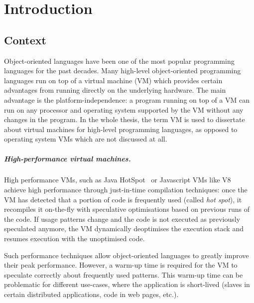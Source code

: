 \documentclass[a4paper,12pt,twoside]{../includes/ThesisStyle}
\begin{document}
\fi

\chapter{Introduction}
\label{chap:intro}
\minitoc

\section{Context}

Object-oriented languages have been one of the most popular programming languages for the past decades. Many high-level object-oriented programming languages run on top of a virtual machine (VM) which provides certain advantages from running directly on the underlying hardware. The main advantage is the platform-independence: a program running on top of a VM can run on any processor and operating system supported by the VM without any changes in the program. In the whole thesis, the term VM is used to dissertate about virtual machines for high-level programming languages, as opposed to operating system VMs which are not discussed at all.

\paragraph{High-performance virtual machines.}
High performance VMs, such as Java HotSpot~\cite{Pale01a} or Javascript VMs like V8~\cite{V8} achieve high performance through just-in-time compilation techniques: once the VM has detected that a portion of code is frequently used (called \emph{hot spot}), it recompiles it on-the-fly with speculative optimisations based on previous runs of the code. If usage patterns change and the code is not executed as previously speculated anymore, the VM dynamically deoptimises the execution stack and resumes execution with the unoptimised code.

Such performance techniques allow object-oriented languages to greatly improve their peak performance. However, a warm-up time is required for the VM to speculate correctly about frequently used patterns. This warm-up time can be problematic for different use-cases, where the application is short-lived (slaves in certain distributed applications, code in web pages, etc.).
\end{document}
